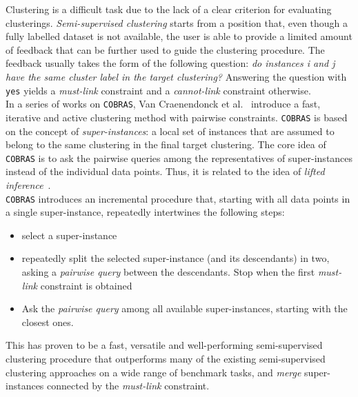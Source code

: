 \begin{tcolorbox}[enhanced,attach boxed title to top center={yshift=-3mm,yshifttext=-1mm}, colback=blue!5!white, colframe=blue!75!black, colbacktitle=white, coltitle=red!25!black,
title=Intermezzo: Semi-supervised clustering with COBRAS,fonttitle=\bfseries, boxed title style={size=small,colframe=blue!75!black} ]

	Clustering is a difficult task due to the lack of a clear criterion for evaluating clusterings.
	\textit{Semi-supervised clustering} starts from a position that, even though a fully labelled dataset is not available, the user is able to provide a limited amount of feedback that can be further used to guide the clustering procedure.
	The feedback usually takes the form of the following question: \textit{do instances i and j have the same cluster label in the target clustering?} Answering the question with \texttt{yes} yields a \textit{must-link} constraint and a \textit{cannot-link} constraint otherwise. \\


	In a series of works on \texttt{COBRAS}, Van Craenendonck et al.~\cite{DBLP:conf/ijcai/CraenendonckDB17,DBLP:journals/corr/abs-1803-11060,DBLP:journals/corr/abs-1805-00779} introduce a fast, iterative and active clustering method with pairwise constraints.
	\texttt{COBRAS} is based on the concept of \textit{super-instances}: a local set of instances that are assumed to belong to the same clustering in the final target clustering.
  The core idea of \texttt{COBRAS} is to ask the pairwise queries among the representatives of super-instances instead of the individual data points.
	Thus, it is related to the idea of \textit{lifted inference}~\cite{Poole:2003:FPI:1630659.1630801}. \\


	\texttt{COBRAS} introduces an incremental procedure that, starting with all data points in a single super-instance, repeatedly intertwines the following steps:
	\begin{itemize}
		\item select a super-instance
		\item repeatedly split the selected super-instance (and its descendants) in two, asking a \textit{pairwise query} between the descendants. Stop when the first \textit{must-link} constraint is obtained
		\item Ask the \textit{pairwise query} among all available super-instances, starting with the closest ones.
	\end{itemize}
	This has proven to be a fast, versatile and well-performing semi-supervised clustering procedure that outperforms many of the existing semi-supervised clustering approaches on a wide range of benchmark tasks, and \textit{merge} super-instances connected by the \textit{must-link} constraint.


\end{tcolorbox}






